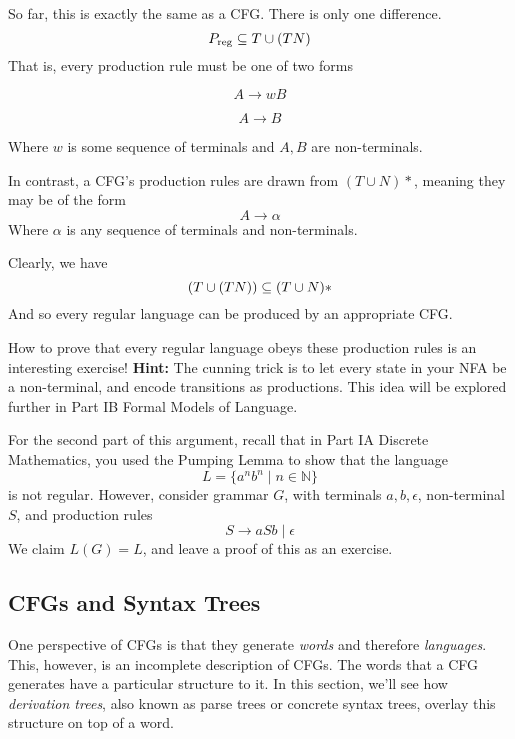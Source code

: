 So far, this is exactly the same as a CFG. There is only one difference.
\[P_\text{reg} \subseteq T\* \cup (T\*N)\]
That is, every production rule must be one of two forms\\
\begin{minipage}[t]{.5\textwidth}
    \vspace{-3mm}
    \[A \rightarrow wB\]
\end{minipage}%
\begin{minipage}[t]{.5\textwidth}
    \vspace{-3mm}
    \[A \rightarrow B\]
\end{minipage}

Where $w$ is some sequence of terminals and $A, B$ are non-terminals.

In contrast, a CFG's production rules are drawn from $(T \cup N)*$, meaning they may be of the form
\[A \rightarrow \alpha\]
Where $\alpha$ is any sequence of terminals and non-terminals. 

Clearly, we have
\[(T\* \cup (T\*N)) \subseteq (T \cup N)*\]
And so every regular language can be produced by an appropriate CFG.

How to prove that every regular language obeys these production rules is an interesting exercise! \textbf{Hint: } The cunning trick is to let every state in your NFA be a non-terminal, and encode transitions as productions. This idea will be explored further in \textsf{Part IB Formal Models of Language}.

For the second part of this argument, recall that in \textsf{Part IA Discrete Mathematics}, you used the Pumping Lemma to show that the language
\[ L = \{ a^nb^n \mid n \in \mathbb{N}\}\]
is not regular. However, consider grammar $G$, with terminals $a, b, \epsilon$, non-terminal $S$, and production rules
\[S \rightarrow aSb \mid \epsilon \]
We claim $L(G) = L$, and leave a proof of this as an exercise.


\subsection{CFGs and Syntax Trees}\label{section:cfg-syntaxtrees}
One perspective of CFGs is that they generate \textit{words} and therefore \textit{languages}. This, however, is an incomplete description of CFGs. The words that a CFG generates have a particular structure to it. In this section, we'll see how \textit{derivation trees}, also known as parse trees or concrete syntax trees, overlay this structure on top of a word.

